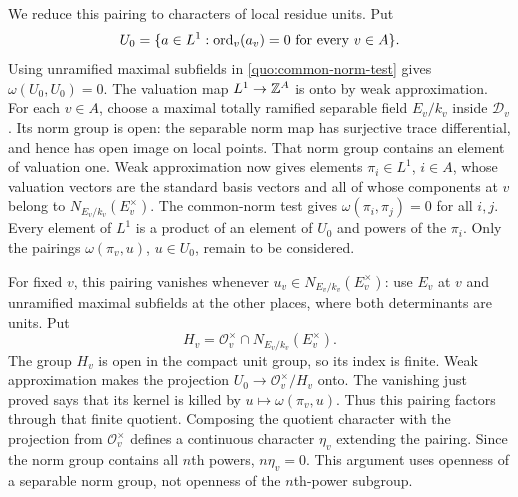 We reduce this pairing to characters of local residue units.  Put
\[
 U_0=\{a\in L^1:\operatorname{ord}_v(a_v)=0\text{ for every }v\in A\}.
\]
Using unramified maximal subfields in \eqref{quo:common-norm-test}
gives $\omega(U_0,U_0)=0$.  The valuation map
$L^1\to\mathbb Z^A$ is onto by weak approximation.  For each $v\in A$,
choose a maximal totally ramified separable field $E_v/k_v$ inside
$\mathcal D_v$.  Its norm group is open: the separable norm map has
surjective trace differential, and hence has open image on local
points.  That norm group contains an element of valuation one.
Weak approximation now gives elements $\pi_i\in L^1$, $i\in A$,
whose valuation vectors are the standard basis vectors and all of
whose components at $v$ belong to $N_{E_v/k_v}(E_v^\times)$.
The common-norm test gives $\omega(\pi_i,\pi_j)=0$ for all $i,j$.
Every element of $L^1$ is a product of an element of $U_0$ and powers
of the $\pi_i$.  Only the pairings $\omega(\pi_v,u)$, $u\in U_0$,
remain to be considered.

For fixed $v$, this pairing vanishes whenever
$u_v\in N_{E_v/k_v}(E_v^\times)$: use $E_v$ at $v$ and unramified
maximal subfields at the other places, where both determinants are
units.  Put
\[
 H_v=\mathcal O_v^\times\cap N_{E_v/k_v}(E_v^\times).
\]
The group $H_v$ is open in the compact unit group, so its index is
finite.  Weak approximation makes the projection
$U_0\to\mathcal O_v^\times/H_v$ onto.  The vanishing just proved
says that its kernel is killed by $u\mapsto\omega(\pi_v,u)$.
Thus this pairing factors through that finite quotient.  Composing
the quotient character with the projection from $\mathcal O_v^\times$
defines a continuous character $\eta_v$ extending the pairing.
Since the norm group contains all $n$th powers, $n\eta_v=0$.
This argument uses openness of a separable norm group, not openness
of the $n$th-power subgroup.

